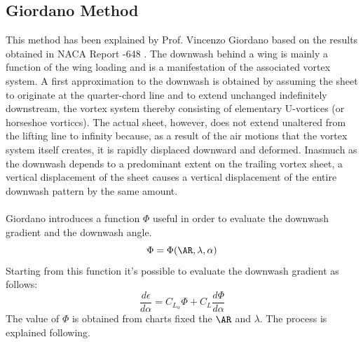\subsection {Giordano Method }
This method has been explained by Prof. Vincenzo Giordano\cite{uninagiordano}  based on the results obtained in NACA Report -648 \cite{Jacobs:NACA:Rep:648}.
The downwash behind a wing is mainly a function of the wing loading and is a manifestation of the associated vortex system. A first approximation to the downwash is obtained by assuming the sheet to originate at the quarter-chord line and to extend unchanged indefinitely downstream, the vortex system thereby consisting of elementary U-vortices (or horseshoe vorticcs). The actual sheet, however, does not extend unaltered from the lifting line to infinity because, as a result of the air motions that the vortex system itself creates, it is rapidly displaced downward and deformed. Inasmuch as the downwash depends to a predominant extent on the trailing vortex sheet, a vertical displacement of the sheet causes a vertical displacement of the entire downwash pattern by the same amount. \\ \\
Giordano introduces a function $\Phi$ useful in order to evaluate the downwash gradient and the downwash angle.
\begin{equation}
\Phi = \Phi ( \AR , \lambda, \alpha)
\end{equation}
Starting from this function it's possible to evaluate the downwash gradient as follows:
\begin{equation}
\frac{d\epsilon}{d \alpha } = C_{L_{\alpha}} \Phi + C_L \frac{d\Phi}{d \alpha }
\end{equation}
The value of $\Phi$ is obtained from charts fixed the $\AR$ and $\lambda$. The process is explained following.
\noindent \\

